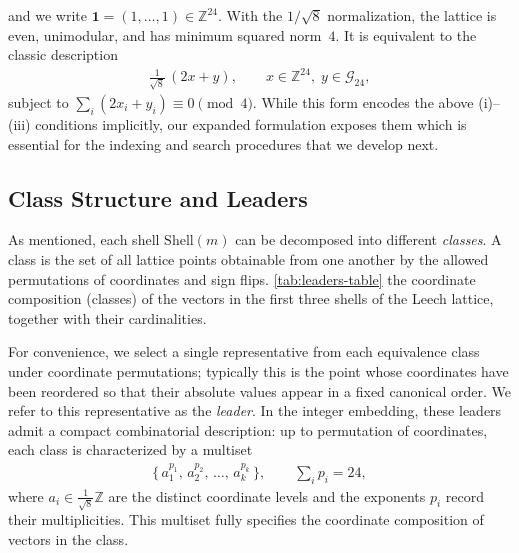 \documentclass{article}
\theoremstyle{plain}
\theoremstyle{definition}
\theoremstyle{remark}
\begin{document}
and we write $\mathbf{1}=(1,\dots,1)\in\mathbb{Z}^{24}$. With the $1/\sqrt{8}$ normalization, the lattice is even, unimodular, and has
minimum squared norm~$4$. It is equivalent to the classic description
{\setlength{\abovedisplayskip}{2pt}
\setlength{\belowdisplayskip}{1pt}
\setlength{\abovedisplayshortskip}{0pt}
\setlength{\belowdisplayshortskip}{1pt} %
\setlength{\jot}{3pt} %
\begin{align}
\frac{1}{\sqrt{8}}\,(2x + y), 
\qquad x \in \mathbb{Z}^{24},\; y \in \mathcal{G}_{24},
\end{align}
}
subject to 
$
\sum_i (2x_i + y_i) \equiv 0 \pmod{4}.
$
While this form encodes the above (i)--(iii) conditions implicitly, our expanded formulation exposes them which is essential for the indexing and search procedures that we develop next.

\subsection{Class Structure and Leaders}
\label{sec:leaders}

As mentioned, each shell $\mathrm{Shell}(m)$ can be decomposed into different \emph{classes}. A class is the set of all lattice points obtainable from one another by the allowed permutations of coordinates and sign flips. \autoref{tab:leaders-table} the coordinate composition (classes) of the vectors in the first three shells of the Leech lattice, together with their cardinalities.

For convenience, we select a single representative from each equivalence class under coordinate permutations; typically this is the point whose coordinates have been reordered so that their absolute values appear in a fixed canonical order. We refer to this representative as the \emph{leader}. In the integer embedding, these leaders admit a compact combinatorial description: up to permutation of coordinates, each class is characterized by a multiset
{\setlength{\abovedisplayskip}{2pt}
\setlength{\belowdisplayskip}{1pt}
\setlength{\abovedisplayshortskip}{0pt}
\setlength{\belowdisplayshortskip}{1pt} %
\setlength{\jot}{3pt} %
\begin{align}
\{\, a_1^{p_1},\, a_2^{p_2},\,\dots,\, a_k^{p_k} \,\}, \qquad \sum_i p_i=24,
\end{align}
}
where $a_i \in \tfrac{1}{\sqrt{8}}\mathbb{Z}$ are the distinct coordinate levels and the exponents $p_i$ record their multiplicities. This multiset fully specifies the coordinate composition of vectors in the class. %
\end{document}
